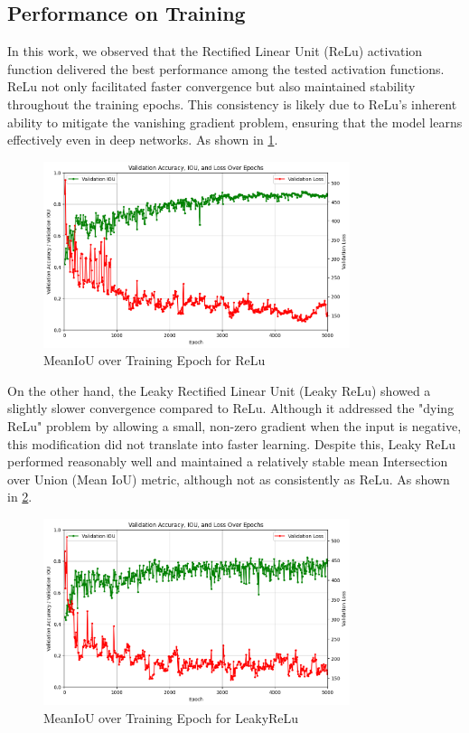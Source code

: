 \documentclass[conference]{IEEEtran}
\begin{document}
\subsection{Performance on Training}
In this work, we observed that the Rectified Linear Unit (ReLu) activation function delivered the best performance among the tested activation functions. ReLu not only facilitated faster convergence but also maintained stability throughout the training epochs. This consistency is likely due to ReLu’s inherent ability to mitigate the vanishing gradient problem, ensuring that the model learns effectively even in deep networks. As shown in \ref{fig:perf_relu}.
\begin{figure}[tp]
    \centering
    \includegraphics[width=0.8\textwidth]{relu_perf.png} %
    \caption{MeanIoU over Training Epoch for ReLu}
    \label{fig:perf_relu}
\end{figure}
On the other hand, the Leaky Rectified Linear Unit (Leaky ReLu) showed a slightly slower convergence compared to ReLu. Although it addressed the "dying ReLu" problem by allowing a small, non-zero gradient when the input is negative, this modification did not translate into faster learning. Despite this, Leaky ReLu performed reasonably well and maintained a relatively stable mean Intersection over Union (Mean IoU) metric, although not as consistently as ReLu. As shown in \ref{fig:perf_leaky}.
\begin{figure}[tp]
    \centering
    \includegraphics[width=0.8\textwidth]{leaky_perf.png} %
    \caption{MeanIoU over Training Epoch for LeakyReLu}
    \label{fig:perf_leaky}
\end{figure}
\end{document}

